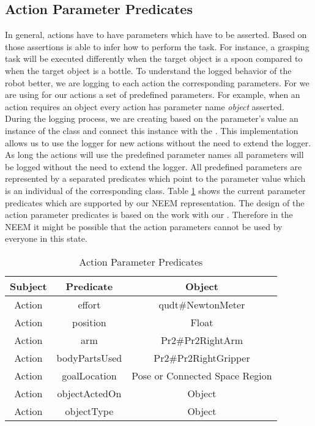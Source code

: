 \subsection{Action Parameter Predicates}
	\label{sec:actionParameterPredicactes}
	In general, actions have to have parameters which have to be asserted.
	Based on those assertions \cram is able to infer how to perform the task.
	For instance, a grasping task will be executed differently when the target object is a spoon compared to when the target object is a bottle.
	To understand the logged behavior of the robot better, we are logging to each action the corresponding parameters.
	For \cram we are using for our actions a set of predefined parameters.
	For example, when an action requires an object every \cram action has parameter name \textit{object} asserted.
	During the logging process, we are creating based on the parameter's value an instance of the class  and connect this instance with the .
	This implementation allows us to use the logger for new actions without the need to extend the logger.
	As long the \cram actions will use the predefined parameter names all parameters will be logged without the need to extend the logger.
	All predefined parameters are represented by a separated predicates which point to the parameter value which is an individual of the corresponding \owl class.
	Table \ref{table:action_parameter_predicates} shows the current parameter predicates which are supported by our NEEM representation.
	The design of the action parameter predicates is based on the work with our \pr.
	Therefore in the NEEM \neemversion it might be possible that the action parameters cannot be used by everyone in this state.
	 
\begin{table}[H]
\begin{tabular}{| c | c | c |}
	\hline			
	\textbf{Subject} & \textbf{Predicate} & \textbf{Object} \\
	\hline			
	Action & effort & qudt\#NewtonMeter \\
	\hline
    Action & position & Float \\
    \hline
	Action & arm & Pr2\#Pr2RightArm \\
	\hline
	Action & bodyPartsUsed & Pr2\#Pr2RightGripper \\
	\hline
	Action & goalLocation & Pose or Connected Space Region \\
	\hline
    Action & objectActedOn & Object \\
	\hline
	Action & objectType & Object \\
	\hline
\end{tabular}
	\caption{Action Parameter Predicates}
	\label{table:action_parameter_predicates}
\end{table}


